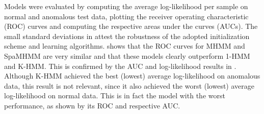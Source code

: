 Models were evaluated by computing the average log-likelihood per sample on normal and anomalous test data, plotting the receiver operating characteristic (ROC) curves and computing the respective areas under the curves (AUCs). The small standard deviations in  attest the robustness of the adopted initialization scheme and learning algorithms.  shows that the ROC curves for MHMM and SpaMHMM are very similar and that these models clearly outperform 1-HMM and K-HMM. This is confirmed by the AUC and log-likelihood results in . Although K-HMM achieved the best (lowest) average log-likelihood on anomalous data, this result is not relevant, since it also achieved the worst (lowest) average log-likelihood on normal data. This is in fact the model with the worst performance, as shown by its ROC and respective AUC.